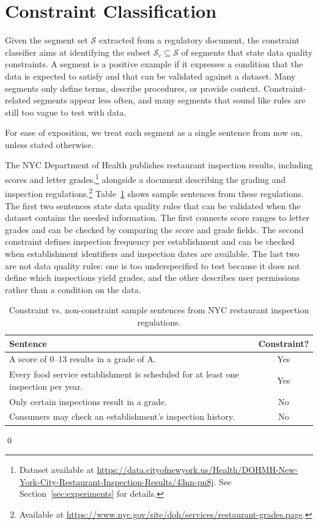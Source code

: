 \section{Constraint Classification}
\label{sec:classifier}
Given the segment set $\mathcal{S}$ extracted from a regulatory document, the constraint classifier aims at identifying the subset $\mathcal{S}_c \subseteq \mathcal{S}$ of segments that state data quality constraints. A segment is a positive example if it expresses a condition that the data is expected to satisfy and that can be 
validated against a dataset. Many segments only define terms, describe procedures, or provide context. Constraint-related segments appear less often, and many segments that sound like rules are still too vague to test with data. 


For ease of exposition, we treat each segment as a single sentence from now on, unless stated otherwise.

\begin{example}
\label{ex:classification}
The NYC Department of Health publishes restaurant inspection results, 
including scores and letter grades,\footnote{Dataset available at 
\url{https://data.cityofnewyork.us/Health/DOHMH-New-York-City-Restaurant-Inspection-Results/43nn-pn8j}. See Section~\ref{sec:experiments} for details.} alongside a document 
describing the grading and inspection regulations.\footnote{Available at 
\url{https://www.nyc.gov/site/doh/services/restaurant-grades.page}.} 
Table~\ref{tab:sentence-types} shows sample sentences from these 
regulations. The first two sentences state data quality rules that can be validated when the dataset contains the needed information. The first connects score ranges to letter grades and can be checked by comparing the score and grade fields. The second constraint defines inspection frequency per establishment and can be checked when establishment identifiers and inspection dates are available. The last two are not data quality rules: one is too underspecified to test because it does not define which inspections yield grades, and the other describes user permissions rather than a condition on the data.
\begin{table}[ht]
\centering
  \caption{Constraint vs. non-constraint sample sentences from NYC restaurant inspection regulations.}
\label{tab:sentence-types}
\small
\begin{tabular}{p{}c}
\toprule
\textbf{Sentence} & \textbf{Constraint?} \\
\midrule
A score of 0--13 results in a grade of A. & Yes \\
Every food service establishment is scheduled for at least one inspection per year. & Yes \\
Only certain inspections result in a grade. & No \\
Consumers may check an establishment's inspection history. & No \\
\bottomrule
\end{tabular}
\end{table}
\qed
\end{example}

